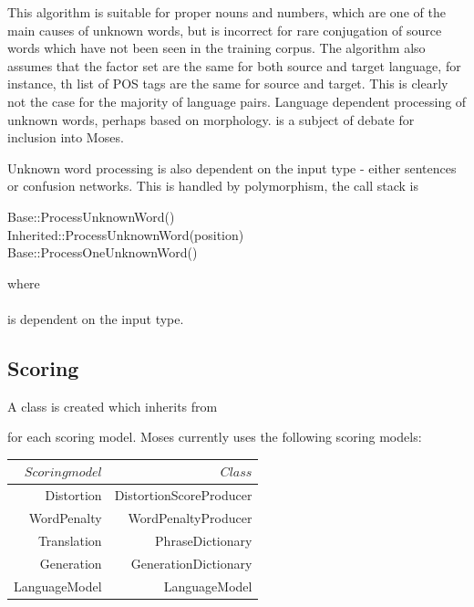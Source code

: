 \documentclass[11pt]{report}
\theoremstyle{plain}
\begin{document}
{This algorithm is suitable for proper nouns and numbers, which are one of the main causes of unknown words, but is incorrect for rare conjugation of source words which have not been seen in the training corpus. The algorithm also assumes that the factor set are the same for both source and target language, for instance, th list of POS tags are the same for source and target. This is clearly not the case for the majority of language pairs. Language dependent processing of unknown words, perhaps based on morphology. is a subject of debate for inclusion into Moses.

Unknown word processing is also dependent on the input type - either sentences or confusion networks. This is handled by polymorphism, the call stack is\\
\begin{tt}
\indent	Base::ProcessUnknownWord()\\
\indent \indent	Inherited::ProcessUnknownWord(position)\\
\indent \indent \indent	Base::ProcessOneUnknownWord()\\
\end{tt}

where\\
\\

is dependent on the input type.

\subsection{Scoring}
A class is created which inherits from\\

for each scoring model. Moses currently uses the following scoring models:\\
\begin{center}
\begin{tabular}{|r|r|}
\hline
$ Scoring model $&$ Class $\\
\hline
Distortion	& DistortionScoreProducer\\
WordPenalty	& WordPenaltyProducer\\
Translation	& PhraseDictionary\\
Generation	& GenerationDictionary\\
LanguageModel	& LanguageModel\\
\hline
\end{tabular}
\end{center}

}
\end{document}

